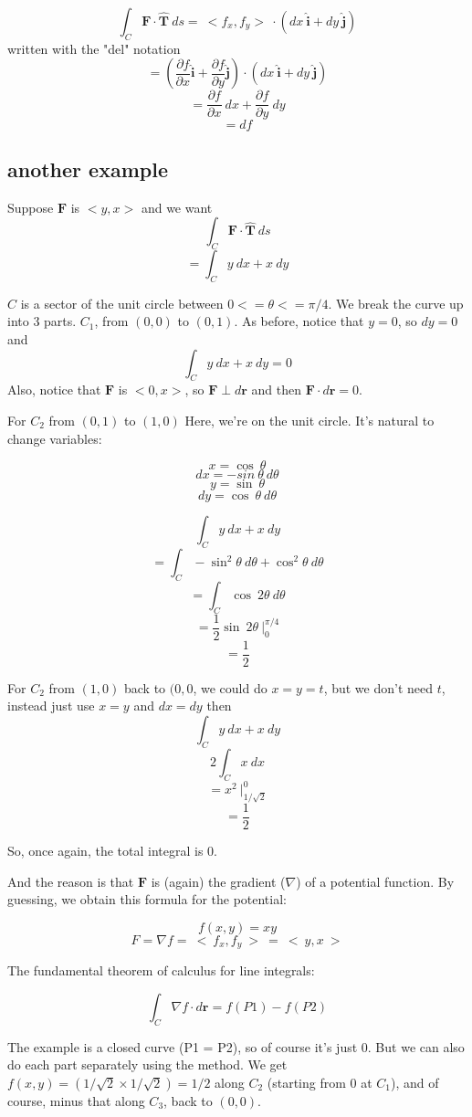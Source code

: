 \documentclass[11pt, oneside]{report}   	%
\begin{document}
\[ \int_C \mathbf{F} \cdot  \hat{\mathbf{T}} \ ds  = \ <f_x,f_y> \  \cdot  (dx\ \hat{\mathbf{i}} + dy\ \hat{\mathbf{j}})  \] 
written with the "del" notation
\[= (\frac{\partial f}{\partial  x} \hat{\mathbf{i}} + \frac{\partial f}{\partial  y} \hat{\mathbf{j}}) \cdot (dx\ \hat{\mathbf{i}} + dy\ \hat{\mathbf{j}}) \]
\[ = \frac{\partial f}{\partial  x} \ dx + \frac{\partial f}{\partial  y} \ dy \]
\[ = df \]
\subsection*{another example}
Suppose $\mathbf{F}$ is $<y,x> $ and we want
\[ \int_C \mathbf{F} \cdot  \hat{\mathbf{T}} \ ds \]
\[ = \int_C y \ dx + x \ dy \]

$C$ is a sector of the unit circle between $0 <= \theta <= \pi/4$.  We break the curve up into 3 parts.
$C_1$, from $(0,0)$ to $(0,1)$.  As before, notice that $y=0$, so $dy=0$ and 
\[ \int_C y \ dx + x \ dy = 0 \]
Also, notice that $\mathbf{F}$ is $<0,x>$, so $\mathbf{F} \perp d\mathbf{r}$ and then  $\mathbf{F} \cdot d\mathbf{r} = 0$.

For $C_2$ from $(0,1)$ to $(1,0)$  Here, we're on the unit circle.  It's natural to change variables:

\[ x = \cos \ \theta \]
\[ dx = -sin \ \theta \ d \theta \]
\[ y = \sin \ \theta \]
\[ dy = \cos \ \theta \ d \theta \]

\[ \int_C y \ dx + x \ dy  \]
\[ = \int_C -\sin^2 \theta \ d \theta + \cos^2 \theta \ d \theta \]
\[ = \int_C \cos \ 2 \theta \ d \theta \]
\[ = \frac{1}{2} \sin \ 2 \theta \ \bigg|_0^{\pi/4} \]
\[ = \frac{1}{2} \]

For $C_2$ from $(1,0)$ back to $(0,0$, we could do $x=y=t$, but we don't need $t$, instead just use $x=y$ and $dx=dy$ then
\[ \int_C y \ dx + x \ dy  \]
\[ 2 \int_C x \ dx \]
\[ = x^2  \ \bigg|_{1/\sqrt{2}}^0 \]
\[ = \frac{1}{2} \]

So, once again, the total integral is $0$.

And the reason is that $\mathbf{F}$ is (again) the gradient ($\nabla$) of a potential function.  By guessing, we obtain this formula for the potential:

\[ f(x,y) = xy \]
\[ F = \nabla f = \ < \ f_x,f_y \ > \ = \ < \ y,x \ > \]

The fundamental theorem of calculus for line integrals:

 \[ \int_C \nabla f \cdot d \mathbf{r} =   f(P1) - f(P2) \]
  
The example is a closed curve (P1 = P2), so of course it's just 0.  But we can also do each part separately using the method.  We get $f(x,y) = (1/\sqrt{2} \times 1/\sqrt{2}) = 1/2$ along $C_2$ (starting from $0$ at $C_1$), and of course, minus that along $C_3$, back to $(0,0)$.
\end{document}
